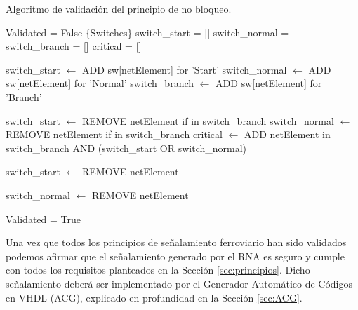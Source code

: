 		\begin{algorithm}[hbt!]
			\caption{Algoritmo de validación del principio de no bloqueo.}\label{alg:ppio_nobloqueo}
			\DontPrintSemicolon
			\SetNoFillComment
			\LinesNotNumbered 
			Validated = False\;
			$\{$Switches$\}$\;
			switch\_start = []\;
			switch\_normal = []\;
			switch\_branch = []\;
			critical = []\;
			
			
			{
				switch\_start $\leftarrow$ ADD sw[netElement] for 'Start'\;
				switch\_normal $\leftarrow$ ADD sw[netElement] for 'Normal'\;
				switch\_branch $\leftarrow$ ADD sw[netElement] for 'Branch'\;
			}	
			
			{
				switch\_start $\leftarrow$ REMOVE netElement if in switch\_branch\;
				switch\_normal $\leftarrow$ REMOVE netElement if in switch\_branch\;
				critical $\leftarrow$ ADD netElement in switch\_branch AND (switch\_start OR switch\_normal)\;
			}	
			
			{
				{
					switch\_start $\leftarrow$ REMOVE netElement\;
				}
				
				{
					switch\_normal $\leftarrow$ REMOVE netElement\;
				}
			}
			
			{
				Validated = True\;
			}
			
		\end{algorithm}
		
		
	Una vez que todos los principios de señalamiento ferroviario han sido validados podemos afirmar que el señalamiento generado por el RNA es seguro y cumple con todos los requisitos planteados en la Sección \ref{sec:principios}. Dicho señalamiento deberá ser implementado por el Generador Automático de Códigos en VHDL (ACG), explicado en profundidad en la Sección \ref{sec:ACG}.
